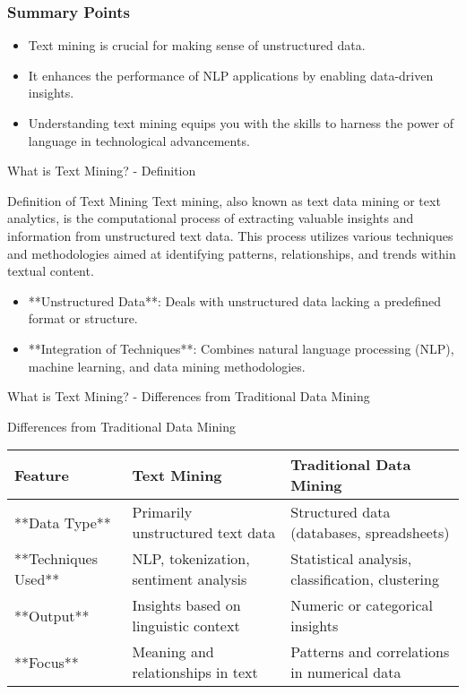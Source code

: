 \documentclass[aspectratio=169]{beamer}
\begin{document}
\begin{frame}[fragile]
    \frametitle{Summary Points}

    \begin{itemize}
        \item Text mining is crucial for making sense of unstructured data.
        \item It enhances the performance of NLP applications by enabling data-driven insights.
        \item Understanding text mining equips you with the skills to harness the power of language in technological advancements.
    \end{itemize}
\end{frame}

\begin{frame}[fragile]{What is Text Mining? - Definition}
    \begin{block}{Definition of Text Mining}
        Text mining, also known as text data mining or text analytics, is the computational process of extracting valuable insights and information from unstructured text data. This process utilizes various techniques and methodologies aimed at identifying patterns, relationships, and trends within textual content.
    \end{block}
    
    \begin{itemize}
        \item **Unstructured Data**: Deals with unstructured data lacking a predefined format or structure.
        \item **Integration of Techniques**: Combines natural language processing (NLP), machine learning, and data mining methodologies.
    \end{itemize}
    
\end{frame}

\begin{frame}[fragile]{What is Text Mining? - Differences from Traditional Data Mining}
    \begin{block}{Differences from Traditional Data Mining}
        \begin{tabular}{|l|l|l|}
            \hline
            \textbf{Feature} & \textbf{Text Mining} & \textbf{Traditional Data Mining} \\
            \hline
            **Data Type** & Primarily unstructured text data & Structured data (databases, spreadsheets) \\
            \hline
            **Techniques Used** & NLP, tokenization, sentiment analysis & Statistical analysis, classification, clustering \\
            \hline
            **Output** & Insights based on linguistic context & Numeric or categorical insights \\
            \hline
            **Focus** & Meaning and relationships in text & Patterns and correlations in numerical data \\
            \hline
        \end{tabular}
    \end{block}
    
\end{frame}
\end{document}

